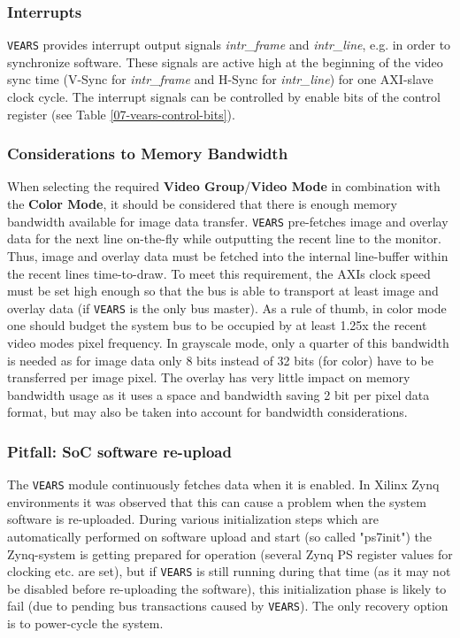 \subsubsection{Interrupts}

\texttt{VEARS} provides interrupt output signals \textit{intr\_frame} and \textit{intr\_line}, e.g. in order to synchronize software. These signals are active high at the beginning of the video sync time (V-Sync for \textit{intr\_frame} and H-Sync for \textit{intr\_line}) for one AXI-slave clock cycle.
The interrupt signals can be controlled by enable bits of the control register (see Table \ref{07-vears-control-bits}).


\subsubsection{Considerations to Memory Bandwidth}

When selecting the required \textbf{Video Group}/\textbf{Video Mode} in combination with the \textbf{Color Mode}, it should be considered that there is enough  memory bandwidth available for image data transfer. \texttt{VEARS} pre-fetches image and overlay data for the next line on-the-fly while outputting the recent line to the monitor. Thus, image and overlay data must be fetched into the internal line-buffer within the recent lines time-to-draw. To meet this requirement, the AXIs clock speed must be set high enough so that the bus is able to transport at least image and overlay data (if \texttt{VEARS} is the only bus master). As a rule of thumb, in color mode one should budget the system bus to be occupied by at least 1.25x the recent video modes pixel frequency. In grayscale mode, only a quarter of this bandwidth is needed as for image data only 8 bits instead of 32 bits (for color) have to be transferred per image pixel. 
The overlay has very little impact on memory bandwidth usage as it uses a space and bandwidth saving 2 bit per pixel data format, but may also be taken into account for bandwidth considerations.


\subsubsection{Pitfall: SoC software re-upload}

The \texttt{VEARS} module continuously fetches data when it is enabled. In Xilinx Zynq environments it was observed that this can cause a problem when the system software is re-uploaded. During various initialization steps which are automatically performed on software upload and start (so called "ps7init") the Zynq-system is getting prepared for operation (several Zynq PS register values for clocking etc. are set), but if \texttt{VEARS} is still running during that time (as it may not be disabled before re-uploading the software), this initialization phase is likely to fail (due to pending bus transactions caused by \texttt{VEARS}). The only recovery option is to power-cycle the system.

